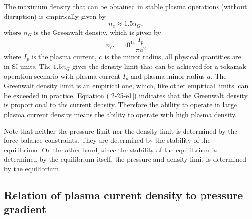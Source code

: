 \documentclass{llncs}
\begin{document}
The maximum density that can be obtained in stable plasma operations (without
disruption) is empirically given by
\begin{equation}
  n_e \approx 1.5 n_G,
\end{equation}
where $n_G$ is the Greenwalt density, which is given by
\begin{equation}
  \label{2-25-e1} n_G = 10^{14} \frac{I_p}{\pi a^2}
\end{equation}
where $I_p$ is the plasma current, $a$ is the minor radius, all physical
quantities are in SI units. The $1.5 n_G$ gives the density limit that can be
achieved for a tokamak operation scenario with plasma current $I_p$ and plasma
minor radius $a$. The Greenwalt density limit is an empirical one, which, like
other empirical limits, can be exceeded in practice. Equation (\ref{2-25-e1})
indicates that the Greenwalt density is proportional to the current density.
Therefore the ability to operate in large plasma current density means the
ability to operate with high plasma density.

Note that neither the pressure limit nor the density limit is determined by
the force-balance constraints. They are determined by the stability of the
equilibrium. On the other hand, since the stability of the equilibrium is
determined by the equilibrium itself, the pressure and density limit is
determined by the equilibrium.

\subsection{Relation of plasma current density to pressure
gradient}\label{20-4-23-a1}
\end{document}
